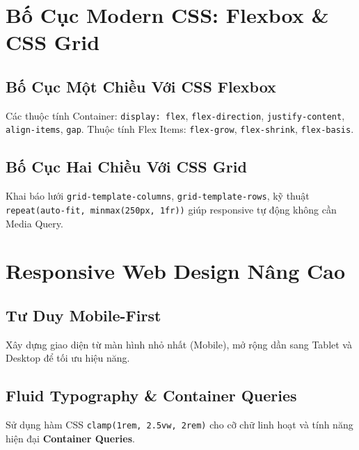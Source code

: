 \documentclass[11pt,oneside]{book}
\newcommand{\codeinline}[1]{\textcolor{accentOrange}{\texttt{#1}}}
\newcommand{\term}[1]{\textbf{\textcolor{primaryBlue}{#1}}}
\begin{document}
\chapter{Bố Cục Modern CSS: Flexbox \& CSS Grid}
\label{chap:flexbox_grid}

\section{Bố Cục Một Chiều Với CSS Flexbox}
Các thuộc tính Container: \codeinline{display: flex}, \codeinline{flex-direction}, \codeinline{justify-content}, \codeinline{align-items}, \codeinline{gap}.
Thuộc tính Flex Items: \codeinline{flex-grow}, \codeinline{flex-shrink}, \codeinline{flex-basis}.

\section{Bố Cục Hai Chiều Với CSS Grid}
Khai báo lưới \codeinline{grid-template-columns}, \codeinline{grid-template-rows}, kỹ thuật \codeinline{repeat(auto-fit, minmax(250px, 1fr))} giúp responsive tự động không cần Media Query.


\chapter{Responsive Web Design Nâng Cao}
\label{chap:responsive_design}

\section{Tư Duy Mobile-First}
Xây dựng giao diện từ màn hình nhỏ nhất (Mobile), mở rộng dần sang Tablet và Desktop để tối ưu hiệu năng.

\section{Fluid Typography \& Container Queries}
Sử dụng hàm CSS \codeinline{clamp(1rem, 2.5vw, 2rem)} cho cỡ chữ linh hoạt và tính năng hiện đại \term{Container Queries}.


\end{document}
